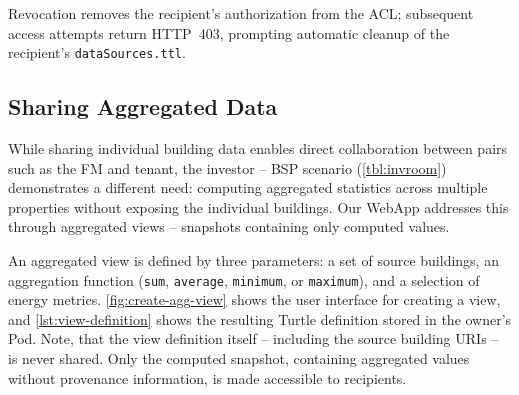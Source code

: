 \documentclass[
]{ceurart}
\begin{document}
Revocation removes the recipient's authorization from the ACL; subsequent access attempts return HTTP~403, prompting automatic cleanup of the recipient's \texttt{dataSources.ttl}.

\subsection{Sharing Aggregated Data}

While sharing individual building data enables direct collaboration between pairs such as the FM and tenant, the investor -- BSP scenario (\cref{tbl:invroom}) demonstrates a different need: computing aggregated statistics across multiple properties without exposing the individual buildings.
Our WebApp addresses this through aggregated views -- snapshots containing only computed values.

An aggregated view is defined by three parameters: a set of source buildings, an aggregation function (\texttt{sum}, \texttt{average}, \texttt{minimum}, or \texttt{maximum}), and a selection of energy metrics.
\cref{fig:create-agg-view} shows the user interface for creating a view, and \cref{lst:view-definition} shows the resulting Turtle definition stored in the owner's Pod.
Note, that the view definition itself -- including the source building URIs -- is never shared.
Only the computed snapshot, containing aggregated values without provenance information, is made accessible to recipients.
\end{document}
